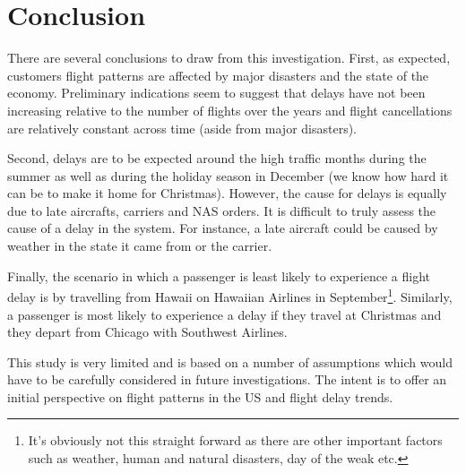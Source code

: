 \documentclass[11pt,twoside,titlepage]{article}
\begin{document}
\section{Conclusion}

There are several conclusions to draw from this investigation. First, as expected, customers flight patterns are affected by major disasters and the state of the economy. Preliminary indications seem to suggest that delays have not been increasing relative to the number of flights over the years and flight cancellations are relatively constant across time (aside from major disasters).

Second, delays are to be expected around the high traffic months during the summer as well as during the holiday season in December (we know how hard it can be to make it home for Christmas). However, the cause for delays is equally due to late aircrafts, carriers and NAS orders. It is difficult to truly assess the cause of a delay in the system. For instance, a late aircraft could be caused by weather in the state it came from or the carrier.

Finally, the scenario in which a passenger is least likely to experience a flight delay is by travelling from Hawaii on Hawaiian Airlines in September\footnote{It's obviously not this straight forward as there are other important factors such as weather, human and natural disasters, day of the weak etc.}. Similarly, a passenger is most likely to experience a delay if they travel at Christmas and they depart from Chicago with Southwest Airlines.

This study is very limited and is based on a number of assumptions which would have to be carefully considered in future investigations. The intent is to offer an initial perspective on flight patterns in the US and flight delay trends.

\clearpage
\break
\newpage
\end{document}
